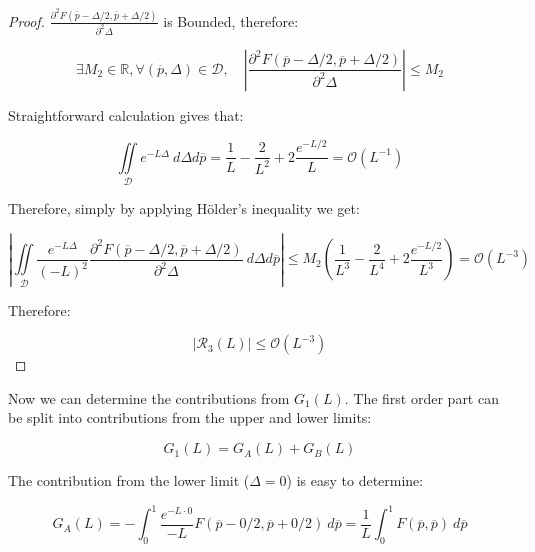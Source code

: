 \documentclass{article}
\theoremstyle{definition}
\begin{document}
\begin{proof}

$\frac{\partial^2 F(\overline{p} - \Delta/2, \overline{p} + \Delta/2) }{\partial^2 \Delta}$ is Bounded, therefore:

\begin{equation}
    \exists M_2 \in \mathbb{R}, \forall (\overline{p},\Delta) \in \mathcal{D}, \quad
    \left |
    \frac{\partial^2
    F(\overline{p} - \Delta/2, \overline{p} + \Delta/2) 
    }{\partial^2 \Delta}
    \right | \le M_2
\end{equation}

Straightforward calculation gives that:

\begin{equation}
    \iint\limits_\mathcal{D} e^{-L \Delta} \ d \Delta d \overline{p}
    =
    \frac{1}{L} - \frac{2}{L^2} + 2 \frac{e^{-L/2}}{L}
    =
    \mathcal{O}(L^{-1})
\end{equation}

Therefore, simply by applying Hölder's inequality \cite{book:Holder} we get:

\begin{equation}
    \left |
    \iint\limits_\mathcal{D} 
    \frac{e^{- L \Delta}}{(- L)^2} 
    \frac{\partial^2
    F(\overline{p} - \Delta/2, \overline{p} + \Delta/2) 
    }{\partial^2 \Delta}
    \ d \Delta d \overline{p}
    \right |
    \le
    M_2 
    \left ( 
    \frac{1}{L^3} - \frac{2}{L^4} + 2 \frac{e^{-L/2}}{L^3}
    \right )
    =
    \mathcal{O}(L^{-3})
\end{equation}

Therefore:

\begin{equation}
    |\mathcal{R}_3(L)| \le \mathcal{O}(L^{-3})
\end{equation}

\end{proof}

Now we can determine the contributions from $G_1(L)$. The first order part can be split into contributions from the upper and lower limits:

\begin{equation}
    G_1(L) = G_A(L) + G_B(L)
\end{equation}

The contribution from the lower limit ($\Delta=0$) is easy to determine:

\begin{equation}
    G_A(L) 
    =
    -
    \int_0^1  
    \frac{e^{- L \cdot 0}}{- L} 
    F(\overline{p} - 0/2, \overline{p} + 0/2) 
    \ d\overline{p}
    =
    \frac{1}{L} 
    \int_0^1  
    F(\overline{p}, \overline{p}) 
    \ d\overline{p}
\end{equation}
\end{document}

